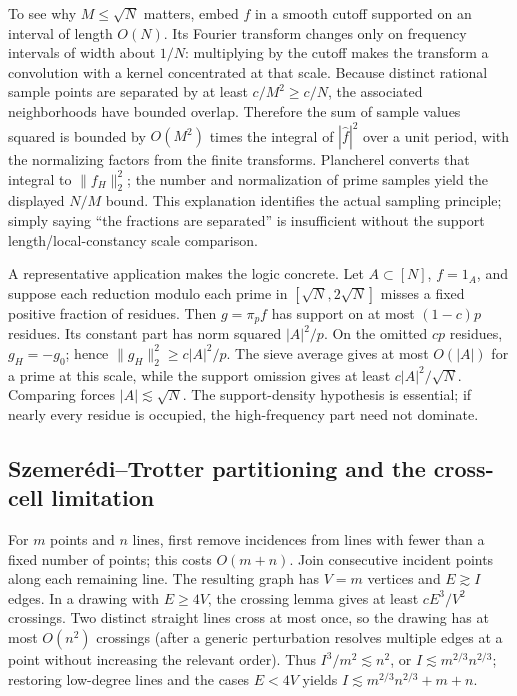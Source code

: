 To see why \(M\le\sqrt N\) matters, embed \(f\) in a smooth cutoff supported on an interval of length \(O(N)\). Its Fourier transform changes only on frequency intervals of width about \(1/N\): multiplying by the cutoff makes the transform a convolution with a kernel concentrated at that scale. Because distinct rational sample points are separated by at least \(c/M^2\ge c/N\), the associated neighborhoods have bounded overlap. Therefore the sum of sample values squared is bounded by \(O(M^2)\) times the integral of \(|\widehat f|^2\) over a unit period, with the normalizing factors from the finite transforms. Plancherel converts that integral to \(\|f_H\|_2^2\); the number and normalization of prime samples yield the displayed \(N/M\) bound. This explanation identifies the actual sampling principle; simply saying ``the fractions are separated'' is insufficient without the support length/local-constancy scale comparison.

A representative application makes the logic concrete. Let \(A\subset[N]\), \(f=1_A\), and suppose each reduction modulo each prime in \([\sqrt N,2\sqrt N]\) misses a fixed positive fraction of residues. Then \(g=\pi_pf\) has support on at most \((1-c)p\) residues. Its constant part has norm squared \(|A|^2/p\). On the omitted \(cp\) residues, \(g_H=-g_0\); hence \(\|g_H\|_2^2\ge c|A|^2/p\). The sieve average gives at most \(O(|A|)\) for a prime at this scale, while the support omission gives at least \(c|A|^2/\sqrt N\). Comparing forces \(|A|\lesssim\sqrt N\). The support-density hypothesis is essential; if nearly every residue is occupied, the high-frequency part need not dominate.

\subsection{Szemerédi--Trotter partitioning and the cross-cell limitation}\label{04-visual-computing-ii-ch033-szemeruxe9ditrotter-partitioning-and-the-cross-cell-limitation}

For \(m\) points and \(n\) lines, first remove incidences from lines with fewer than a fixed number of points; this costs \(O(m+n)\). Join consecutive incident points along each remaining line. The resulting graph has \(V=m\) vertices and \(E\gtrsim I\) edges. In a drawing with \(E\ge4V\), the crossing lemma gives at least \(cE^3/V^2\) crossings. Two distinct straight lines cross at most once, so the drawing has at most \(O(n^2)\) crossings (after a generic perturbation resolves multiple edges at a point without increasing the relevant order). Thus \(I^3/m^2\lesssim n^2\), or \(I\lesssim m^{2/3}n^{2/3}\); restoring low-degree lines and the cases \(E<4V\) yields \(I\lesssim m^{2/3}n^{2/3}+m+n\).

